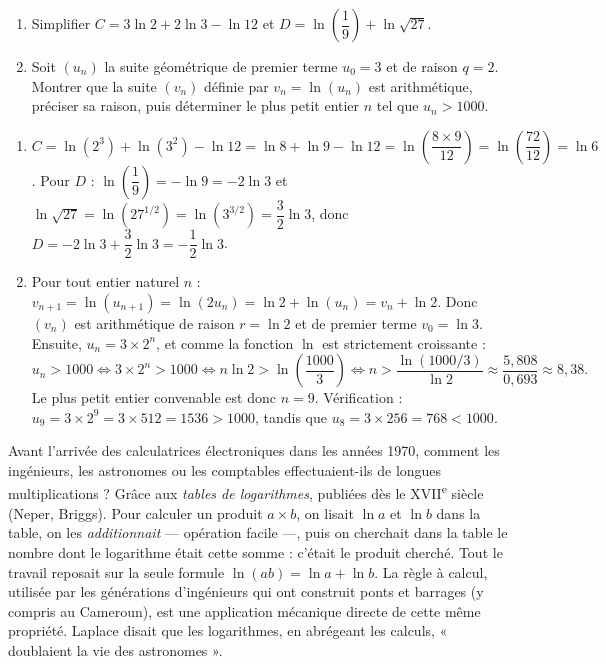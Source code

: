 \documentclass[11pt]{article}
\begin{document}
\begin{exercice}
\begin{enumerate}
\item Simplifier $C = 3\ln 2 + 2\ln 3 - \ln 12$ et $D = \ln\left(\dfrac{1}{9}\right) + \ln\sqrt{27}$.
\item Soit $(u_n)$ la suite géométrique de premier terme $u_0 = 3$ et de raison $q = 2$. Montrer que la suite $(v_n)$ définie par $v_n = \ln(u_n)$ est arithmétique, préciser sa raison, puis déterminer le plus petit entier $n$ tel que $u_n > 1000$.
\end{enumerate}
\end{exercice}

\begin{corrige}[Exercice]
\begin{enumerate}
\item $C = \ln(2^3) + \ln(3^2) - \ln 12 = \ln 8 + \ln 9 - \ln 12 = \ln\left(\dfrac{8 \times 9}{12}\right) = \ln\left(\dfrac{72}{12}\right) = \ln 6$. Pour $D$ : $\ln\left(\dfrac{1}{9}\right) = -\ln 9 = -2\ln 3$ et $\ln\sqrt{27} = \ln(27^{1/2}) = \ln(3^{3/2}) = \dfrac{3}{2}\ln 3$, donc $D = -2\ln 3 + \dfrac{3}{2}\ln 3 = -\dfrac{1}{2}\ln 3$.
\item Pour tout entier naturel $n$ : $v_{n+1} = \ln(u_{n+1}) = \ln(2u_n) = \ln 2 + \ln(u_n) = v_n + \ln 2$. Donc $(v_n)$ est arithmétique de raison $r = \ln 2$ et de premier terme $v_0 = \ln 3$. Ensuite, $u_n = 3 \times 2^n$, et comme la fonction $\ln$ est strictement croissante :
\[ u_n > 1000 \iff 3 \times 2^n > 1000 \iff n\ln 2 > \ln\left(\frac{1000}{3}\right) \iff n > \frac{\ln(1000/3)}{\ln 2} \approx \frac{5{,}808}{0{,}693} \approx 8{,}38. \]
Le plus petit entier convenable est donc $n = 9$. Vérification : $u_9 = 3 \times 2^9 = 3 \times 512 = 1536 > 1000$, tandis que $u_8 = 3 \times 256 = 768 < 1000$.
\end{enumerate}
\end{corrige}

\begin{savaistu}
Avant l'arrivée des calculatrices électroniques dans les années 1970, comment les ingénieurs, les astronomes ou les comptables effectuaient-ils de longues multiplications ? Grâce aux \emph{tables de logarithmes}, publiées dès le XVII\textsuperscript{e} siècle (Neper, Briggs). Pour calculer un produit $a \times b$, on lisait $\ln a$ et $\ln b$ dans la table, on les \emph{additionnait} — opération facile —, puis on cherchait dans la table le nombre dont le logarithme était cette somme : c'était le produit cherché. Tout le travail reposait sur la seule formule $\ln(ab) = \ln a + \ln b$. La règle à calcul, utilisée par les générations d'ingénieurs qui ont construit ponts et barrages (y compris au Cameroun), est une application mécanique directe de cette même propriété. Laplace disait que les logarithmes, en abrégeant les calculs, « doublaient la vie des astronomes ».
\end{savaistu}
\end{document}
